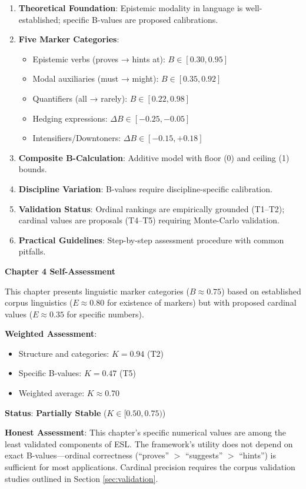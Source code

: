 \documentclass[11pt,a4paper]{article}
\theoremstyle{remark}
\begin{document}
\begin{enumerate}
    \item \textbf{Theoretical Foundation}: Epistemic modality in language is well-established; specific B-values are proposed calibrations.

    \item \textbf{Five Marker Categories}:
    \begin{itemize}
        \item Epistemic verbs (proves → hints at): $B \in [0.30, 0.95]$
        \item Modal auxiliaries (must → might): $B \in [0.35, 0.92]$
        \item Quantifiers (all → rarely): $B \in [0.22, 0.98]$
        \item Hedging expressions: $\Delta B \in [-0.25, -0.05]$
        \item Intensifiers/Downtoners: $\Delta B \in [-0.15, +0.18]$
    \end{itemize}

    \item \textbf{Composite B-Calculation}: Additive model with floor (0) and ceiling (1) bounds.

    \item \textbf{Discipline Variation}: B-values require discipline-specific calibration.

    \item \textbf{Validation Status}: Ordinal rankings are empirically grounded (T1--T2); cardinal values are proposals (T4--T5) requiring Monte-Carlo validation.

    \item \textbf{Practical Guidelines}: Step-by-step assessment procedure with common pitfalls.
\end{enumerate}

\begin{eslbox}
\textbf{Chapter 4 Self-Assessment}

This chapter presents linguistic marker categories ($B \approx 0.75$) based on established corpus linguistics ($E \approx 0.80$ for existence of markers) but with proposed cardinal values ($E \approx 0.35$ for specific numbers).

\textbf{Weighted Assessment}:
\begin{itemize}
    \item Structure and categories: $K = 0.94$ (T2)
    \item Specific B-values: $K = 0.47$ (T5)
    \item Weighted average: $K \approx 0.70$
\end{itemize}

\textbf{Status}: \textcolor{eslorange}{\textbf{Partially Stable}} ($K \in [0.50, 0.75)$)

\textbf{Honest Assessment}: This chapter's specific numerical values are among the least validated components of ESL. The framework's utility does not depend on exact B-values---ordinal correctness (``proves'' $>$ ``suggests'' $>$ ``hints'') is sufficient for most applications. Cardinal precision requires the corpus validation studies outlined in Section \ref{sec:validation}.
\end{eslbox}
\end{document}
